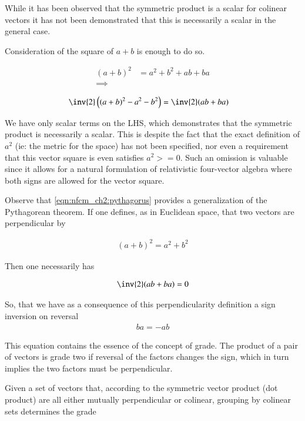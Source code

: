 While it has been observed that the symmetric product is a scalar for colinear vectors
it has not been
demonstrated that this is necessarily a scalar in the general case.

Consideration of the square of $a + b$ is enough to do so.

\begin{align*}
(a + b)^2 &= a^2 + b^2 + ab + ba \\
\implies \\
\end{align*}
\begin{align}\label{eqn:nfcm_ch2:pythagorus}
\inv{2}\left((a + b)^2 - a^2 - b^2\right) &= \inv{2}(ab + ba)
\end{align}

We have only scalar terms on the LHS, which demonstrates that the symmetric product is necessarily a scalar.
This is despite the fact that the exact definition of $a^2$ (ie: the metric for the space) has not been specified, nor even
a requirement that this vector square is even satisfies $a^2 >= 0$.  Such an omission is valuable since it allows
for a natural formulation of relativistic four-vector algebra where both signs are allowed for the vector square.

Observe that \ref{eqn:nfcm_ch2:pythagorus} provides a generalization of the Pythagorean theorem.  If one defines, as in
Euclidean space, that two vectors are perpendicular by

\begin{align*}
(a + b)^2 = a^2 + b^2
\end{align*}

Then one necessarily has

\begin{align*}
\inv{2}(ab + ba) = 0 
\end{align*}

So, that we have as a consequence of this perpendicularity definition a sign inversion on reversal
\begin{align*}
ba = -ab
\end{align*}

This equation contains the essence of the concept of grade.  The product of a pair of vectors is grade two
if reversal of the factors changes the sign, which in turn implies the two factors must be perpendicular.

Given a set of vectors that, according to the symmetric vector product (dot product) are all either mutually perpendicular or colinear, grouping by colinear sets determines the grade

